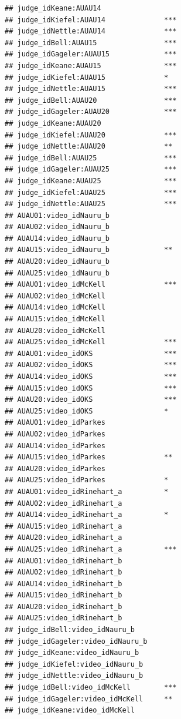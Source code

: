 \documentclass{monashthesis}
\begin{document}
\begin{verbatim}
## judge_idKeane:AUAU14                  
## judge_idKiefel:AUAU14              ***
## judge_idNettle:AUAU14              ***
## judge_idBell:AUAU15                ***
## judge_idGageler:AUAU15             ***
## judge_idKeane:AUAU15               ***
## judge_idKiefel:AUAU15              *  
## judge_idNettle:AUAU15              ***
## judge_idBell:AUAU20                ***
## judge_idGageler:AUAU20             ***
## judge_idKeane:AUAU20                  
## judge_idKiefel:AUAU20              ***
## judge_idNettle:AUAU20              ** 
## judge_idBell:AUAU25                ***
## judge_idGageler:AUAU25             ***
## judge_idKeane:AUAU25               ***
## judge_idKiefel:AUAU25              ***
## judge_idNettle:AUAU25              ***
## AUAU01:video_idNauru_b                
## AUAU02:video_idNauru_b                
## AUAU14:video_idNauru_b                
## AUAU15:video_idNauru_b             ** 
## AUAU20:video_idNauru_b                
## AUAU25:video_idNauru_b                
## AUAU01:video_idMcKell              ***
## AUAU02:video_idMcKell                 
## AUAU14:video_idMcKell                 
## AUAU15:video_idMcKell                 
## AUAU20:video_idMcKell                 
## AUAU25:video_idMcKell              ***
## AUAU01:video_idOKS                 ***
## AUAU02:video_idOKS                 ***
## AUAU14:video_idOKS                 ***
## AUAU15:video_idOKS                 ***
## AUAU20:video_idOKS                 ***
## AUAU25:video_idOKS                 *  
## AUAU01:video_idParkes                 
## AUAU02:video_idParkes                 
## AUAU14:video_idParkes                 
## AUAU15:video_idParkes              ** 
## AUAU20:video_idParkes                 
## AUAU25:video_idParkes              *  
## AUAU01:video_idRinehart_a          *  
## AUAU02:video_idRinehart_a             
## AUAU14:video_idRinehart_a          *  
## AUAU15:video_idRinehart_a             
## AUAU20:video_idRinehart_a             
## AUAU25:video_idRinehart_a          ***
## AUAU01:video_idRinehart_b             
## AUAU02:video_idRinehart_b             
## AUAU14:video_idRinehart_b             
## AUAU15:video_idRinehart_b             
## AUAU20:video_idRinehart_b             
## AUAU25:video_idRinehart_b             
## judge_idBell:video_idNauru_b          
## judge_idGageler:video_idNauru_b       
## judge_idKeane:video_idNauru_b         
## judge_idKiefel:video_idNauru_b        
## judge_idNettle:video_idNauru_b        
## judge_idBell:video_idMcKell        ***
## judge_idGageler:video_idMcKell     ** 
## judge_idKeane:video_idMcKell          

\end{verbatim}
\end{document}
